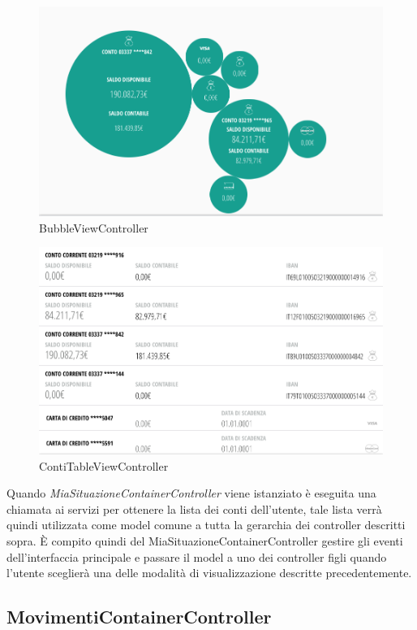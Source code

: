 \begin{figure}[!htbp]
\centering
\includegraphics[scale=0.35]{dettagli/bubble.png}
\caption{BubbleViewController}
\end{figure}
\begin{figure}[!htbp]
\centering
\includegraphics[scale=0.35]{dettagli/contiList.png}
\caption{ContiTableViewController}
\end{figure}
Quando \emph{MiaSituazioneContainerController} viene istanziato è eseguita una chiamata ai servizi per ottenere la lista dei conti dell'utente, tale lista verrà quindi utilizzata come model comune a tutta la gerarchia dei controller descritti sopra. È compito quindi del MiaSituazioneContainerController gestire gli eventi dell'interfaccia principale e passare il model a uno dei controller figli quando l'utente sceglierà una delle modalità di visualizzazione descritte precedentemente. 

\subsection{MovimentiContainerController}

